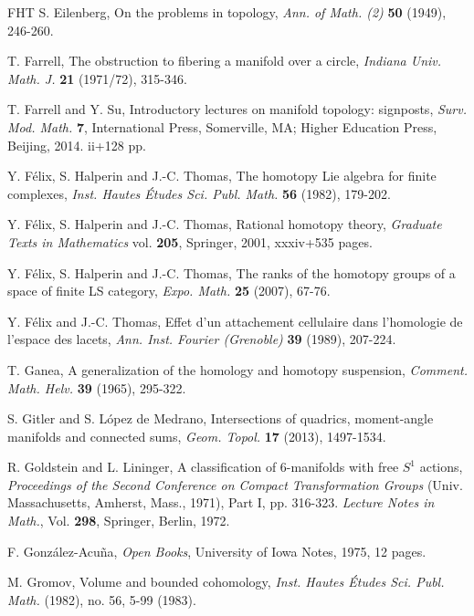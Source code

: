 \documentclass[a4]{amsart}
\theoremstyle{definition}
\begin{document}
\begin{sloppypar}
\begin{thebibliography}{FHT}
 S. Eilenberg, On the problems in topology, \emph{Ann. of Math. (2)} \textbf{50} (1949), 246-260.

 T. Farrell, The obstruction to fibering a manifold over a circle, \emph{Indiana Univ. Math. J.} \textbf{21} (1971/72), 315-346. 
   
 T. Farrell and Y. Su, Introductory lectures on manifold topology: signposts, \emph{Surv. Mod. Math.} \textbf{7}, International Press, Somerville, MA; Higher Education Press, Beijing, 2014. ii+128 pp.   
   

 Y. F\'{e}lix, S. Halperin and J.-C. Thomas, The homotopy Lie algebra for finite complexes, \emph{Inst. Hautes \'{E}tudes Sci. Publ. Math.} \textbf{56} (1982), 179-202. 

 Y. F\'{e}lix, S. Halperin and J.-C. Thomas, Rational homotopy theory, \emph{Graduate Texts in Mathematics} vol. \textbf{205}, Springer, 2001, xxxiv+535 pages.

 Y. F\'{e}lix, S. Halperin and J.-C. Thomas, The ranks of the homotopy groups of a space of finite LS category, \emph{Expo. Math.} \textbf{25} (2007), 67-76.
   
 Y. F\'{e}lix and J.-C. Thomas, Effet d'un attachement cellulaire dans l'homologie de l'espace des lacets, \emph{Ann. Inst. Fourier (Grenoble)} \textbf{39} (1989), 207-224.


 T. Ganea, A generalization of the homology and homotopy suspension, \emph{Comment. Math. Helv.} \textbf{39} (1965), 295-322.  


 S. Gitler and S. L\'{o}pez de Medrano, Intersections of quadrics, 
   moment-angle manifolds and connected sums, \emph{Geom. Topol.} \textbf{17} (2013), 
   1497-1534. 
   
 R. Goldstein and L. Lininger, A classification of $6$-manifolds with free $S^1$ actions, \emph{Proceedings of the Second Conference on Compact Transformation Groups} (Univ. Massachusetts, Amherst, Mass., 1971), Part I, pp. 316-323. \emph{Lecture Notes in Math.}, Vol. \textbf{298}, Springer, Berlin, 1972.   

 F. Gonz\'{a}lez-Acu\~{n}a, \emph{Open Books}, University of Iowa Notes, 1975, 12 pages.  

 M. Gromov, Volume and bounded cohomology, 
\emph{Inst. Hautes \'{E}tudes Sci. Publ. Math.} (1982), no. 56, 5-99 (1983).


\end{thebibliography}
\end{sloppypar}
\end{document}
